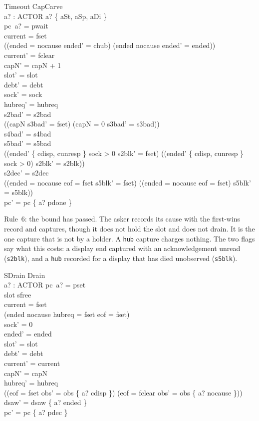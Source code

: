 \documentclass[a4paper,10pt,fleqn]{article}
\begin{document}
\begin{schema}{Timeout}
  CapCarve \\
  a? : ACTOR
\where
  a? \in \{ aSt, aSp, aDi \} \\
  pc~a? = pwait \\
  current = fset \\
  ((ended = nocause \land ended' = chub) \lor (ended \neq nocause \land ended' = ended)) \\
  current' = fclear \\
  capN' = capN + 1 \\
  slot' = slot \\
  debt' = debt \\
  sock' = sock \\
  hubreq' = hubreq \\
  s2bad' = s2bad \\
  ((capN  \land s3bad' = fset) \lor (capN = 0 \land s3bad' = s3bad)) \\
  s4bad' = s4bad \\
  s5bad' = s5bad \\
  ((ended' \in \{ cdisp, cunresp \} \land sock > 0 \land s2blk' = fset) \lor
    (\lnot (ended' \in \{ cdisp, cunresp \} \land sock > 0) \land s2blk' = s2blk)) \\
  s2dec' = s2dec \\
  ((ended = nocause \land eof = fset \land s5blk' = fset) \lor
    (\lnot (ended = nocause \land eof = fset) \land s5blk' = s5blk)) \\
  pc' = pc \oplus \{ a? \mapsto pdone \}
\end{schema}

Rule~6: the bound has passed.  The asker records its cause with the first-wins
record and captures, though it does not hold the slot and does not drain.  It is
the one capture that is not by a holder.  A \texttt{hub} capture charges nothing.
The two flags say what this costs: a display end captured with an
acknowledgement unread (\texttt{s2blk}), and a \texttt{hub} recorded for a
display that has died unobserved (\texttt{s5blk}).

\begin{schema}{SDrain}
  Drain \\
  a? : ACTOR
\where
  pc~a? = pset \\
  slot \neq sfree \\
  current = fset \\
  (ended \neq nocause \lor hubreq = fset \lor eof = fset) \\
  sock' = 0 \\
  ended' = ended \\
  slot' = slot \\
  debt' = debt \\
  current' = current \\
  capN' = capN \\
  hubreq' = hubreq \\
  ((eof = fset \land obs' = obs \oplus \{ a? \mapsto cdisp \}) \lor
    (eof = fclear \land obs' = obs \oplus \{ a? \mapsto nocause \})) \\
  dsaw' = dsaw \oplus \{ a? \mapsto ended \} \\
  pc' = pc \oplus \{ a? \mapsto pdec \}
\end{schema}
\end{document}

